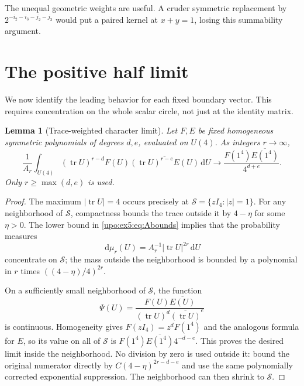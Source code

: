 \documentclass[11pt,letterpaper]{article}
\newtheorem{lemma}[theorem]{Lemma}
\theoremstyle{remark}\newtheorem{remark}[theorem]{Remark}
\numberwithin{equation}{section}
\newcommand{\tr}{\operatorname{tr}}
\newcommand{\dd}{\,\mathrm d}
\begin{document}
The unequal geometric weights are useful. A cruder symmetric
replacement by $2^{-i_2-i_3-j_2-j_3}$ would put a paired kernel at
$x+y=1$, losing this summability argument.

\section{The positive half limit}\label{upo:ex5:sec:halflimit}
We now identify the leading behavior for each fixed boundary vector.
This requires concentration on the whole scalar circle, not just at
the identity matrix.

\begin{lemma}[Trace-weighted character limit]\label{upo:ex5:lem:haar}
Let $F,E$ be fixed homogeneous symmetric polynomials of degrees
$d,e$, evaluated on $U(4)$. As integers $r\to\infty$,
\begin{equation}\label{upo:ex5:eq:haar}
 \frac{1}{A_r}\int_{U(4)}
   (\tr U)^{r-d}F(U)
   \overline{(\tr U)^{r-e}E(U)}\dd U
 \longrightarrow\frac{F(1^4)\overline{E(1^4)}}{4^{d+e}}.
\end{equation}
Only $r\ge\max(d,e)$ is used.
\end{lemma}
\begin{proof}
The maximum $|\tr U|=4$ occurs precisely at
$\mathcal S=\{zI_4:|z|=1\}$. For any neighborhood of $\mathcal S$,
compactness bounds the trace outside it by $4-\eta$ for some
$\eta>0$. The lower bound in \eqref{upo:ex5:eq:Abounds} implies that the
probability measures
\[
 \dd\mu_r(U)=A_r^{-1}|\tr U|^{2r}\dd U
\]
concentrate on $\mathcal S$; the mass outside the neighborhood is
bounded by a polynomial in $r$ times $((4-\eta)/4)^{2r}$.

On a sufficiently small neighborhood of $\mathcal S$, the function
\[
 \Psi(U)=\frac{F(U)\overline{E(U)}}
                  {(\tr U)^d\overline{(\tr U)}^e}
\]
is continuous. Homogeneity gives $F(zI_4)=z^dF(1^4)$ and the
analogous formula for $E$, so its value on all of $\mathcal S$ is
$F(1^4)\overline{E(1^4)}4^{-d-e}$. This proves the desired limit
inside the neighborhood. No division by zero is used outside it:
bound the original numerator directly by
$C(4-\eta)^{2r-d-e}$ and use the same polynomially corrected
exponential suppression. The neighborhood can then shrink to
$\mathcal S$.
\end{proof}
\end{document}

